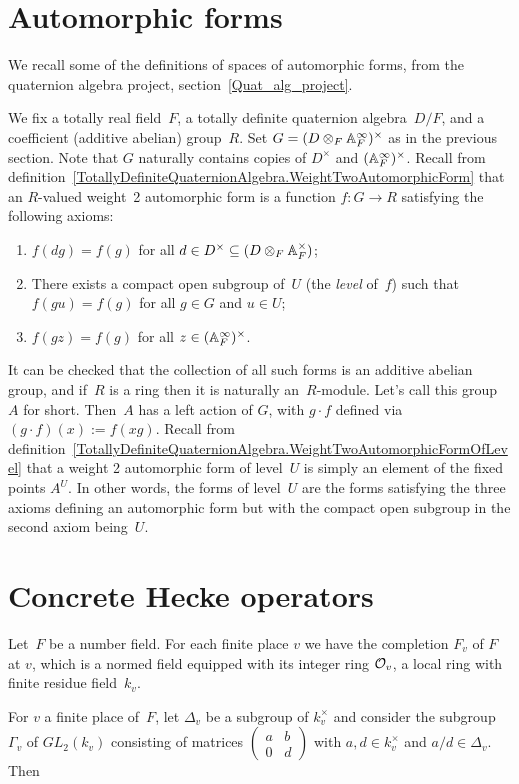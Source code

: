\section{Automorphic forms}

We recall some of the definitions of spaces of automorphic forms, from
the quaternion algebra project, section~\ref{Quat_alg_project}.

We fix a totally real field~$F$, a
totally definite quaternion algebra~$D/F$, and a coefficient (additive abelian) group~$R$.
Set $G=(D\otimes_F\mathbb{A}_F^\infty)^\times$ as in the previous section. Note that $G$
naturally contains copies of $D^\times$ and $(\mathbb{A}_F^\infty)^\times$. Recall from
definition~\ref{TotallyDefiniteQuaternionAlgebra.WeightTwoAutomorphicForm}
that an $R$-valued weight~2 automorphic form
is a function $f:G\to R$ satisfying the following axioms:
\begin{enumerate}
  \item $f(dg)=f(g)$ for all $d\in D^\times\subseteq(D\otimes_F\mathbb{A}_F^\times)$;
  \item There exists a compact open subgroup of~$U$ (the \emph{level} of~$f$)
    such that $f(gu)=f(g)$ for all $g\in G$ and $u\in U$;
  \item $f(gz)=f(g)$ for all $z\in(\mathbb{A}_F^\infty)^\times$.
\end{enumerate}

It can be checked that the collection of all such forms is an additive abelian group,
and if~$R$ is a ring then it is naturally an~$R$-module. Let's call this group~$A$ for short.
Then~$A$ has a left action of $G$, with $g\cdot f$
defined via $(g\cdot f)(x):=f(xg)$. Recall from
definition~\ref{TotallyDefiniteQuaternionAlgebra.WeightTwoAutomorphicFormOfLevel}
that a weight 2 automorphic form of level~$U$ is simply an element of the
fixed points $A^U$. In other words, the forms of level~$U$ are the forms satisfying the three axioms
defining an automorphic form but with the compact open subgroup in the second
axiom being~$U$.

\section{Concrete Hecke operators}

Let~$F$ be a number field. For each finite place $v$ we have the completion $F_v$ of $F$ at $v$,
which is a normed field equipped with its integer ring $\mathcal{O}_v$, a local ring with
finite residue field~$k_v$.

For $v$ a finite place of~$F$, let $\Delta_v$ be a subgroup of $k_v^\times$ and consider
the subgroup $\Gamma_v$ of $GL_2(k_v)$ consisting of matrices $\begin{pmatrix}a&b\\0&d\end{pmatrix}$
with $a,d\in k_v^\times$ and $a/d\in\Delta_v$. Then

